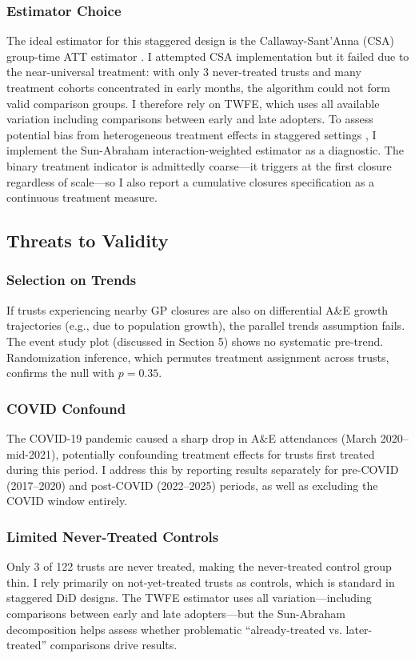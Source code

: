 \documentclass[12pt]{article}
\begin{document}
\subsubsection*{Estimator Choice}
The ideal estimator for this staggered design is the Callaway-Sant'Anna (CSA) group-time ATT estimator \citep{callaway2021difference}. I attempted CSA implementation but it failed due to the near-universal treatment: with only 3 never-treated trusts and many treatment cohorts concentrated in early months, the algorithm could not form valid comparison groups. I therefore rely on TWFE, which uses all available variation including comparisons between early and late adopters. To assess potential bias from heterogeneous treatment effects in staggered settings \citep{goodman2021difference, roth2023pretest}, I implement the Sun-Abraham interaction-weighted estimator as a diagnostic. The binary treatment indicator is admittedly coarse---it triggers at the first closure regardless of scale---so I also report a cumulative closures specification as a continuous treatment measure.

\subsection{Threats to Validity}

\subsubsection*{Selection on Trends}
If trusts experiencing nearby GP closures are also on differential A\&E growth trajectories (e.g., due to population growth), the parallel trends assumption fails. The event study plot (discussed in Section 5) shows no systematic pre-trend. Randomization inference, which permutes treatment assignment across trusts, confirms the null with $p = 0.35$.

\subsubsection*{COVID Confound}
The COVID-19 pandemic caused a sharp drop in A\&E attendances (March 2020--mid-2021), potentially confounding treatment effects for trusts first treated during this period. I address this by reporting results separately for pre-COVID (2017--2020) and post-COVID (2022--2025) periods, as well as excluding the COVID window entirely.

\subsubsection*{Limited Never-Treated Controls}
Only 3 of 122 trusts are never treated, making the never-treated control group thin. I rely primarily on not-yet-treated trusts as controls, which is standard in staggered DiD designs. The TWFE estimator uses all variation---including comparisons between early and late adopters---but the Sun-Abraham decomposition helps assess whether problematic ``already-treated vs. later-treated'' comparisons drive results.
\end{document}
